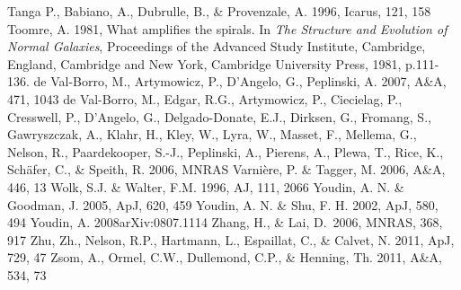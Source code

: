 \documentclass[apj]{emulateapj}
\begin{document}
\begin{thebibliography}{}
 Tanga P., Babiano, A., Dubrulle, B., \& Provenzale, A. 1996, Icarus, 121, 158
 Toomre, A. 1981, What amplifies the spirals. In {\it The Structure and Evolution of Normal Galaxies}, Proceedings of the Advanced Study Institute, Cambridge, England, Cambridge and New York, Cambridge University Press, 1981, p.111-136.
de Val-Borro, M., Artymowicz, P., D'Angelo, G., Peplinski, A. 2007, A\&A, 471, 1043
de Val-Borro, M., Edgar, R.G., Artymowicz, P., Ciecielag, P., Cresswell, P., D'Angelo, G., Delgado-Donate, E.J., Dirksen, G., Fromang, S., Gawryszczak, A., Klahr, H., Kley, W., Lyra, W., Masset, F., Mellema, G., Nelson, R., Paardekooper, S.-J., Peplinski, A., Pierens, A., Plewa, T., Rice, K., Sch\"afer, C., \& Speith, R. 2006, MNRAS
 Varni\`ere, P. \& Tagger, M. 2006, A\&A, 446, 13
 Wolk, S.J. \& Walter, F.M. 1996, AJ, 111, 2066
 Youdin, A. N. \& Goodman, J. 2005, ApJ, 620, 459
 Youdin, A. N. \& Shu, F. H. 2002, ApJ, 580, 494
 Youdin, A. 2008arXiv:0807.1114
 Zhang, H., \& Lai, D.\ 2006, MNRAS, 368, 917
 Zhu, Zh., Nelson, R.P., Hartmann, L.,  Espaillat, C., \& Calvet, N. 2011, ApJ, 729, 47
 Zsom, A., Ormel, C.W., Dullemond, C.P., \& Henning, Th. 2011, A\&A, 534, 73

\end{thebibliography}
\end{document}
